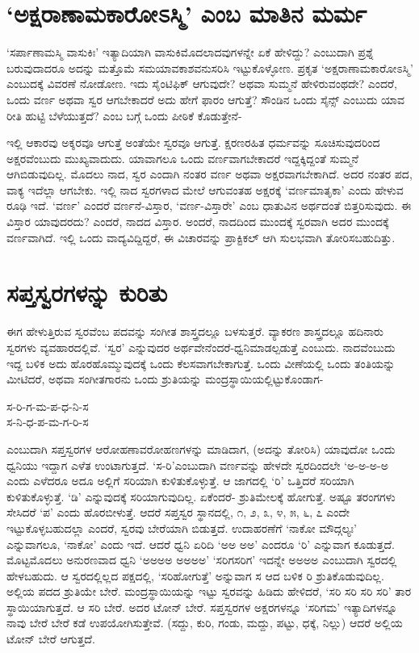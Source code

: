 \section*{`ಅಕ್ಷರಾಣಾಮಕಾರೋಽಸ್ಮಿ' ಎಂಬ ಮಾತಿನ ಮರ್ಮ}
\label{95}

`ಸರ್ಪಾಣಾಮಸ್ಮಿ ವಾಸುಕಿಃ' ಇತ್ಯಾದಿಯಾಗಿ ವಾಸುಕಿಮೊದಲಾದವುಗಳನ್ನೇ ಏಕೆ ಹೇಳಿದ್ದು? ಎಂಬುದಾಗಿ ಪ್ರಶ್ನೆ ಬರುವುದಾದರೂ ಅದನ್ನು ಮತ್ತೊಮೆ ಸಮಯಾವಕಾಶವನುಸರಿಸಿ ಇಟ್ಟುಕೊಳ್ಳೋಣ. ಪ್ರಕೃತ `ಅಕ್ಷರಾಣಾಮಕಾರೋಽಸ್ಮಿ' ಎಂಬುದಕ್ಕೆ ವಿವರಣೆ ನೋಡೋಣ. ಇದು ಸೈಂಟಿಫಿಕ್ ಆಗುವುದೇ? ಅಥವಾ ಸುಮ್ಮನೆ ಹೇಳಿರುವಂಥದೇ? ಎಂದರೆ, ಒಂದು ವರ್ಣ ಅಥವಾ ಸ್ವರ ಆಗಬೇಕಾದರೆ ಅದು ಹೇಗೆ ಫಾರಂ ಆಗುತ್ತೆ? ಸೌಂಡಿನ ಒಂದು ಸೈನ್ಸ್ ಎಂಬುದು ಯಾವ ರೀತಿ ಹುಟ್ಟಿ ಬೆಳೆಯುತ್ತದೆ? ಎಂಬ ಬಗ್ಗೆ ಒಂದು ಪೀಠಿಕೆ ಕೊಡುತ್ತೇನೆ-

ಇಲ್ಲಿ ಆಕಾರವು ಅಕ್ಶರವೂ ಆಗುತ್ತೆ ಅಂತೆಯೇ ಸ್ವರವೂ ಆಗುತ್ತೆ. ಕ್ಷರಣರಹಿತ ಧರ್ಮವನ್ನು ಸೂಚಿಸುವುದರಿಂದ ಅಕ್ಷರವೆಂಬುದು ಮುಖ್ಯವಾದುದು. ಯಾವಾಗಲೂ ಒಂದು ವರ್ಣವಾಗಬೇಕಾದರೆ ಇದ್ದಕ್ಕಿದ್ದಂತೆ ಸುಮ್ಮನೆ ಆಗಿಬಿಡುವುದಿಲ್ಲ. ಮೊದಲು ನಾದ, ಸ್ವರ ಎಂದಾಗಿ ನಂತರ ವರ್ಣ ಅಥವಾ ಅಕ್ಷರವಾಗಬೇಕಾಗಿದೆ. ಅದರ ನಂತರ ಪದ, ವಾಕ್ಯ ಇದೆಲ್ಲಾ ಆಗಬೇಕು. ಇಲ್ಲಿ ನಾದ ಸ್ವರಗಳಾದ ಮೇಲೆ ಆಗುವಂತಹ ಅಕ್ಷರಕ್ಕೆ `ವರ್ಣಮಾತೃಕಾ' ಎಂದು ಹೇಳುವ ರೂಢಿ ಇದೆ. `ವರ್ಣ' ಎಂದರೆ ವರ್ಣನೆ-ವಿಸ್ತಾರ, `ವರ್ಣ-ವಿಸ್ತಾರೇ' ಎಂಬ ಧಾತುವಿನ ಅರ್ಥದಂತೆ ಬಿತ್ತರಿಸುವುದು. ಈ ವಿಸ್ತಾರ ಯಾವುದರದು? ಎಂದರೆ, ನಾದದ ವಿಸ್ತಾರ. ಅಂದರೆ, ನಾದದಿಂದ ಮುಂದಕ್ಕೆ ಸ್ವರವಾಗಿ ಅದರ ಮುಂದಕ್ಕೆ ವರ್ಣವಾಗಿದೆ. ಇಲ್ಲಿ ಒಂದು ವಾದ್ಯವಿದ್ದಿದ್ದರೆ, ಈ ವಿಚಾರವನ್ನು ಪ್ರಾಕ್ಟಿಕಲ್ ಆಗಿ ಸುಲಭವಾಗಿ ತೋರಿಸಬಹುದಿತ್ತು.

\section*{ಸಪ್ತಸ್ವರಗಳನ್ನು ಕುರಿತು}

ಈಗ ಹೇಳುತ್ತಿರುವ ಸ್ವರವೆಂಬ ಪದವನ್ನು ಸಂಗೀತ ಶಾಸ್ತ್ರದಲ್ಲೂ ಬಳಸುತ್ತರೆ. ವ್ಯಾಕರಣ ಶಾಸ್ತ್ರದಲ್ಲೂ ಹದಿನಾರು ಸ್ವರಗಳು ವ್ಯವಹಾರದಲ್ಲಿವೆ. `ಸ್ವರ' ಎನ್ನುವುದರ ಅರ್ಥವೇನೆಂದರೆ-ಧ್ವನಿಮಾಡಲ್ಪಡುತ್ತೆ ಎಂಬುದು. ನಾದವೆಂಬುದು ಇದ್ದ ಬಳಿಕ ಅದು ಹೊರಹೊಮ್ಮುವುದಕ್ಕೆ ಒಂದು ಕೆಲಸವಾಗಬೇಕಾಗುತ್ತೆ. ಒಂದು ವೀಣೆಯಲ್ಲಿ ಒಂದು ತಂತಿಯನ್ನು ಮೀಟಿದರೆ, ಅಥವಾ ಸಂಗೀತಗಾರನು ಒಂದು ಶ್ರುತಿಯನ್ನು ಮಂದ್ರಸ್ಥಾಯಿಯಲ್ಲಿಟ್ಟುಕೊಂಡಾಗ-

\begin{shloka}
ಸ-ರಿ-ಗ-ಮ-ಪ-ಧ-ನಿ-ಸ\\
ಸ-ನಿ-ಧ-ಪ-ಮ-ಗ-ರಿ-ಸ
\end{shloka}
ಎಂಬುದಾಗಿ ಸಪ್ತಸ್ವರಗಳ ಆರೋಹಣಾವರೋಹಣಗಳನ್ನು ಮಾಡಿದಾಗ, (ಅದನ್ನು ತೋರಿಸಿ) ಯಾವುದೋ ಒಂದು ಧ್ವನಿಯು ಇದ್ದಾಗ ಎಳೆತ ಉಂಟಾಗುತ್ತದೆ. `ಸ-ರಿ'ಎಂಬುದಾಗಿ ವರ್ಣವನ್ನು ಹೇಳದೇ ಸ್ವರದಿಂದಲೇ `ಅ-ಅ-ಅ-ಅ ಎಂದು ಎಳೆದರೂ ಅದೂ ಅಲ್ಲಿಗೆ ಸರಿಯಾಗಿ ಕುಳಿತುಕೊಳ್ಳುತ್ತೆ. ಆ ಜಾಗದಲ್ಲಿ `ರಿ' ಒತ್ತಿದರೆ ಸರಿಯಾಗಿ ಕುಳಿತುಕೊಳ್ಳುತ್ತೆ. `ಡಿ' ಎನ್ನುವುದಕ್ಕೆ ಸರಿಯಾಗುವುದಿಲ್ಲ. ಏಕೆಂದರೆ- ಶ್ರುತಿಮೇಲಕ್ಕೆ ಹೋಗುತ್ತೆ. ಅಷ್ಟೂ ತರಂಗಗಳು ಸೇಸಿದರೆ `ಪ' ಎಂದು ಹೊರಬೀಳುತ್ತೆ. ಆದರೆ ಸಪ್ತಸ್ವರ ಸ್ಥಾನದಲ್ಲಿ, ೧, ೨, ೩, ೪, ೫, ೬, ೭ ಎಂದೇ ಇಟ್ಟುಕೊಳ್ಳಬಹುದಲ್ಲಾ ಎಂದರೆ, ಸ್ವರವು ಬೇರೆಯಾಗಿ ಬಿಡುತ್ತದೆ. ಉದಾಹರಣೆಗೆ `ನಾಕೋ ಮೌದ್ಗಲ್ಯಃ' ಎನ್ನುವಾಗಲೂ, `ನಾಕೋ' ಎಂದು ಇದೆ. ಆದರೆ ಧ್ವನಿ ಏರಿದಿ `ಅ‌ಅ  ಅ‌ಅ' ಎಂದರೂ `ರಿ' ಎನ್ನುವಾಗ ಕೂಡುತ್ತದೆ. ಮೊಟ್ಟಮೊದಲು ಅನುರಣವಾದ ಧ್ವನಿ `ಅ‌ಅಅ‌ಅ ಅ‌ಅಅ‌ಅ' `ಸರಿಗಸರಿಗ' ಇದನ್ನೇ ಅ‌ಅಅ‌ಅ ಎಂಬುದಾಗಿ ಸ್ವರದಲ್ಲಿ ಹೇಳಬಹುದು. ಆ ಸ್ವರದಲ್ಲಿಲ್ಲದ ಪಕ್ಷದಲ್ಲಿ, `ಸರಿಹೋಗುತ್ತೆ' ಅನ್ನುವಾಗ ಸ ಆದ ಬಳಿಕ ರಿ ಶ್ರುತಿಕೊಡುವುದಿಲ್ಲ. ಅಲ್ಲಿಯ ಪದದ ಶ್ರುತಿಯೇ ಬೇರೆ. ಮಂದ್ರಸ್ಥಾಯಿಯನ್ನು ಇಟ್ಟು ಸ್ವರವನ್ನು ಹಿಡಿದು ಹೇಳಿದರೆ, `ಸರಿ ಸರಿ ಸರಿ ಸರಿ' ತಾರ ಸ್ಥಾಯಿಯಾಗುತ್ತದೆ. ಆ ಸರಿ ಬೇರೆ. ಅದರ ಟೋನ್ ಬೇರೆ. ಸಪ್ತಸ್ವರಗಳ ಅಕ್ಷರಗಳನ್ನೂ `ಸರಿಗಮ' ಇತ್ಯಾದಿಗಳನ್ನೂ ನಾವು ಬೇರೆ ಬೇರೆ ಕಡೆ ಉಪಯೋಗಿಸುತ್ತೇವೆ. (ಸದ್ದು, ಕುರಿ, ಗಂಡು, ಮದ್ದು, ಪಟ್ಟು, ಧಕ್ಕೆ, ನಿಲ್ಲು) ಆದರೆ ಅಲ್ಲಿಯ ಟೋನ್ ಬೇರೆ ಆಗುತ್ತದೆ.

